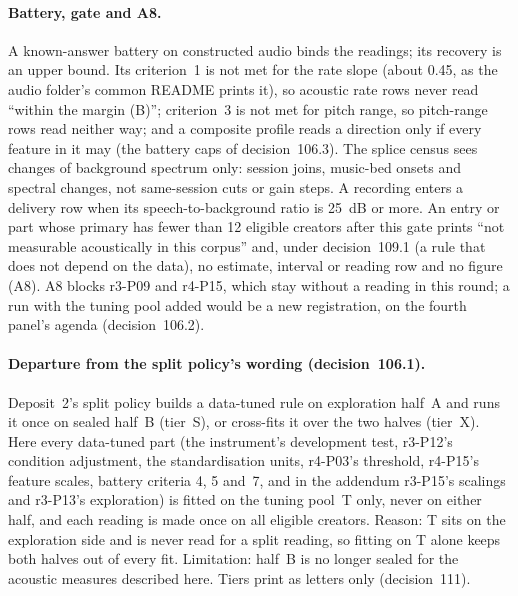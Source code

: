 \paragraph{Battery, gate and A8.} A known-answer battery on constructed audio binds the readings; its recovery is an
upper bound. Its criterion~1 is not met for the rate slope (about 0.45, as the audio folder's common README prints it),
so acoustic rate rows never read ``within the margin (B)''; criterion~3 is not met for pitch range, so pitch-range rows
read neither way; and a composite profile reads a direction only if every feature in it may (the battery caps of
decision~106.3). The splice census sees changes of background spectrum only: session joins, music-bed onsets and
spectral changes, not same-session cuts or gain steps. A recording enters a delivery row when its speech-to-background
ratio is 25~dB or more. An entry or part whose primary has fewer than 12 eligible creators after this gate prints ``not
measurable acoustically in this corpus'' and, under decision~109.1 (a rule that does not depend on the data), no
estimate, interval or reading row and no figure (A8). A8 blocks r3-P09 and r4-P15, which stay without a reading in this
round; a run with the tuning pool added would be a new registration, on the fourth panel's agenda (decision~106.2).

\paragraph{Departure from the split policy's wording (decision~106.1).} Deposit~2's split policy builds a data-tuned rule
on exploration half~A and runs it once on sealed half~B (tier~S), or cross-fits it over the two halves (tier~X). Here
every data-tuned part (the instrument's development test, r3-P12's condition adjustment, the standardisation units,
r4-P03's threshold, r4-P15's feature scales, battery criteria 4, 5 and~7, and in the addendum r3-P15's scalings and
r3-P13's exploration) is fitted on the tuning pool~T only, never on either half, and each reading is made once on all
eligible creators. Reason: T sits on the exploration side and is never read for a split reading, so fitting on T alone
keeps both halves out of every fit. Limitation: half~B is no longer sealed for the acoustic measures described here.
Tiers print as letters only (decision~111).

